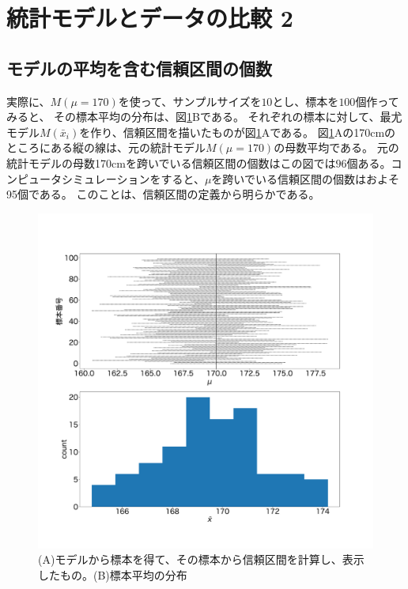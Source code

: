 
\section{統計モデルとデータの比較 2}


\subsection{モデルの平均を含む信頼区間の個数}
実際に、$M(\mu=170)$を使って、$サンプルサイズを10$とし、標本を$100$個作ってみると、
その標本平均の分布は、図\ref{fig:confidence_interval_sample}Bである。
それぞれの標本に対して、最尤モデル$M(\bar{x}_i)$を作り、信頼区間を描いたものが図\ref{fig:confidence_interval_sample}Aである。
図\ref{fig:confidence_interval_sample}Aの170cmのところにある縦の線は、元の統計モデル$M(\mu=170)$の母数平均である。
元の統計モデルの母数170cmを跨いでいる信頼区間の個数はこの図では$96$個ある。コンピュータシミュレーションをすると、$\mu$を跨いでいる信頼区間の個数はおよそ95個である。
このことは、信頼区間の定義から明らかである。

\begin{figure}
\begin{center}
    \includegraphics[width=15cm]{./image/03_/confidence_interval_model_count.pdf}
    \caption{(A)モデルから標本を得て、その標本から信頼区間を計算し、表示したもの。(B)標本平均の分布}
    \label{fig:confidence_interval_sample}
  \end{center}
\end{figure}


